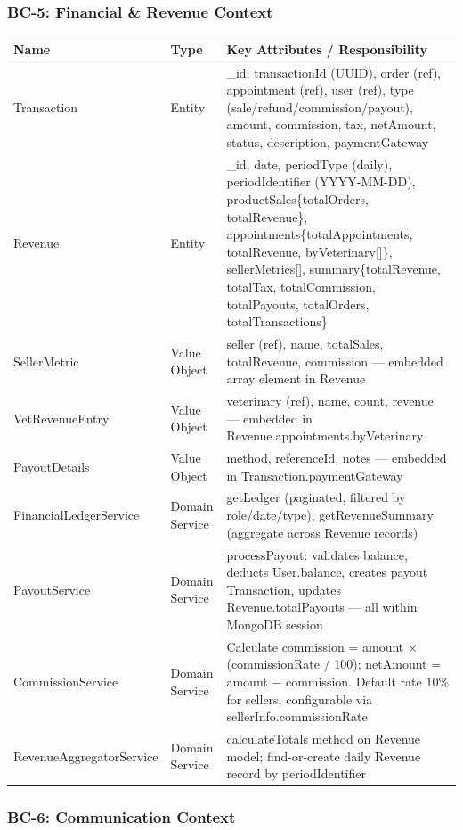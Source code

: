 \documentclass[12pt,a4paper]{article}
\begin{document}
\subsubsection{BC-5: Financial \& Revenue Context}

\begin{center}
\begin{tabular}{@{}p{3.5cm}p{2cm}p{8.5cm}@{}}
\toprule
\textbf{Name} & \textbf{Type} & \textbf{Key Attributes / Responsibility} \\
\midrule
Transaction & Entity & \_id, transactionId (UUID), order (ref), appointment (ref), user (ref), type (sale/refund/commission/payout), amount, commission, tax, netAmount, status, description, paymentGateway \\
Revenue & Entity & \_id, date, periodType (daily), periodIdentifier (YYYY-MM-DD), productSales\{totalOrders, totalRevenue\}, appointments\{totalAppointments, totalRevenue, byVeterinary[]\}, sellerMetrics[], summary\{totalRevenue, totalTax, totalCommission, totalPayouts, totalOrders, totalTransactions\} \\
SellerMetric & Value Object & seller (ref), name, totalSales, totalRevenue, commission — embedded array element in Revenue \\
VetRevenueEntry & Value Object & veterinary (ref), name, count, revenue — embedded in Revenue.appointments.byVeterinary \\
PayoutDetails & Value Object & method, referenceId, notes — embedded in Transaction.paymentGateway \\
FinancialLedgerService & Domain Service & getLedger (paginated, filtered by role/date/type), getRevenueSummary (aggregate across Revenue records) \\
PayoutService & Domain Service & processPayout: validates balance, deducts User.balance, creates payout Transaction, updates Revenue.totalPayouts — all within MongoDB session \\
CommissionService & Domain Service & Calculate commission = amount × (commissionRate / 100); netAmount = amount − commission. Default rate 10\% for sellers, configurable via sellerInfo.commissionRate \\
RevenueAggregatorService & Domain Service & calculateTotals method on Revenue model; find-or-create daily Revenue record by periodIdentifier \\
\bottomrule
\end{tabular}
\end{center}

\subsubsection{BC-6: Communication Context}
\end{document}
